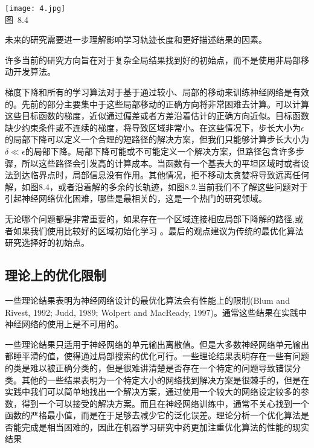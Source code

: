 \begin{center}
\texttt{[image: 4.jpg]}\\
图~8.4
\end{center}

未来的研究需要进一步理解影响学习轨迹长度和更好描述结果的因素。

许多当前的研究方向旨在对于复杂全局结果找到好的初始点，而不是使用非局部移动开发算法。

梯度下降和所有的学习算法对于基于通过较小、局部的移动来训练神经网络是有效的。先前的部分主要集中于这些局部移动的正确方向将非常困难去计算。可以计算这些目标函数的梯度，近似通过偏差或者方差沿着估计的正确方向近似。目标函数缺少约束条件或不连续的梯度，将导致区域非常小。在这些情况下，步长大小为$\epsilon$的局部下降可以定义一个合理的短路径的解决方案，但我们只能够计算步长大小为$\delta \ll \epsilon$的局部下降。局部下降可能或不可能定义一个解决方案，但路径包含许多步骤，所以这些路径会引发高的计算成本。当函数有一个基表大的平坦区域时或者设法到达临界点时，局部信息没有作用。其他情况，拒不移动太贪婪将导致远离任何解，如图8.4，或者沿着解的多余的长轨迹，如图8.2.当前我们不了解这些问题对于引起神经网络优化困难，哪些是最相关的，这是一个热门的研究领域。

无论哪个问题都是非常重要的，如果存在一个区域连接相应局部下降解的路径,或者如果我们使用比较好的区域初始化学习 。最后的观点建议为传统的最优化算法研究选择好的初始点。

\subsection{理论上的优化限制}
一些理论结果表明为神经网络设计的最优化算法会有性能上的限制(Blum and Rivest,
1992; Judd, 1989; Wolpert and MacReady, 1997)。通常这些结果在实践中神经网络的使用上是不可用的。

一些理论结果只适用于神经网络的单元输出离散值。但是大多数神经网络单元输出都睡平滑的值，使得通过局部搜索的优化可行。一些理论结果表明存在一些有问题的类是难以被正确分类的，但是很难讲清楚是否存在一个特定的问题导致错误分类。其他的一些结果表明为一个特定大小的网络找到解决方案是很棘手的，但是在实践中我们可以简单地找出一个解决方案，通过使用一个较大的网络设定较多的参数，得到一个可以接受的解决方案。而且在神经网络训练中，通常不关心找到一个函数的严格最小值，而是在于足够去减少它的泛化误差。理论分析一个优化算法是否能完成是相当困难的，因此在机器学习研究中药更加注重优化算法的性能的现实结果
